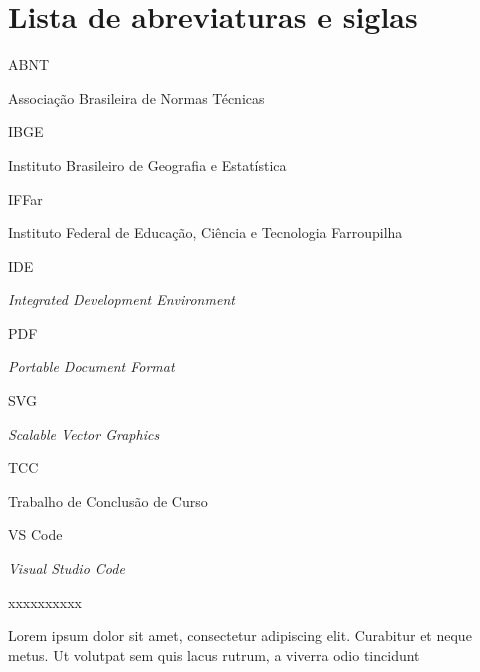 \newcommand\siglaLargura{10ex} %
\newcommand\siglaGap{1ex} %
\newcommand\nomeSiglaLargura{\dimexpr\linewidth-\siglaLargura-\siglaGap\relax}
\newcommand\sigla[2]{\noindent\parbox[t]{\siglaLargura}{#1\strut}%
  \hspace{\siglaGap}%
  \parbox[t]{\nomeSiglaLargura}{#2\strut}}

\chapter*{Lista de abreviaturas e siglas}


\sigla{ABNT}{Associação Brasileira de Normas Técnicas}

\sigla{IBGE}{Instituto Brasileiro de Geografia e Estatística}

\sigla{IFFar}{Instituto Federal de Educação, Ciência e Tecnologia Farroupilha}

\sigla{IDE}{\textit{Integrated Development Environment}}

\sigla{PDF}{\textit{Portable Document Format}}

\sigla{SVG}{\textit{Scalable Vector Graphics}}

\sigla{TCC}{Trabalho de Conclusão de Curso}

\sigla{VS Code}{\textit{Visual Studio Code}}

\sigla{xxxxxxxxxx}{Lorem ipsum dolor sit amet, consectetur adipiscing elit. Curabitur et neque metus. Ut volutpat sem quis lacus rutrum, a viverra odio tincidunt}

\OnesideTwoside{\clearpage}{\cleardoublepage}